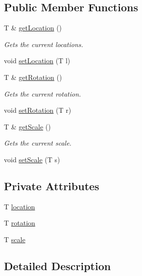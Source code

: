 \subsection*{Public Member Functions}
\begin{DoxyCompactItemize}
\item 
T \& \hyperlink{classpcs_1_1Transformable_ae335d66eb0d036c8e62058536fda86dd}{get\+Location} ()
\begin{DoxyCompactList}\small\item\em Gets the current locations. \end{DoxyCompactList}\item 
void \hyperlink{classpcs_1_1Transformable_a75978563b612578414d891702e1b90cb}{set\+Location} (T l)
\item 
T \& \hyperlink{classpcs_1_1Transformable_a499e12e4561a18c9c09c8140f015e974}{get\+Rotation} ()
\begin{DoxyCompactList}\small\item\em Gets the current rotation. \end{DoxyCompactList}\item 
void \hyperlink{classpcs_1_1Transformable_a00408e9a0998cf61c6a05ce7f58d065a}{set\+Rotation} (T r)
\item 
T \& \hyperlink{classpcs_1_1Transformable_a16a53284c2ec9931fc0f171d7682e67d}{get\+Scale} ()
\begin{DoxyCompactList}\small\item\em Gets the current scale. \end{DoxyCompactList}\item 
void \hyperlink{classpcs_1_1Transformable_a8fe25e4a1f53d00a6b55527ce5cb0124}{set\+Scale} (T s)
\end{DoxyCompactItemize}
\subsection*{Private Attributes}
\begin{DoxyCompactItemize}
\item 
T \hyperlink{classpcs_1_1Transformable_a3953d8911519e5349f4424bf04f7d572}{location}
\item 
T \hyperlink{classpcs_1_1Transformable_a3e5c81be5acff0d32eea189fea4b0642}{rotation}
\item 
T \hyperlink{classpcs_1_1Transformable_ad2fabe2ecf3a75bcb76597b33182ba0d}{scale}
\end{DoxyCompactItemize}


\subsection{Detailed Description}
